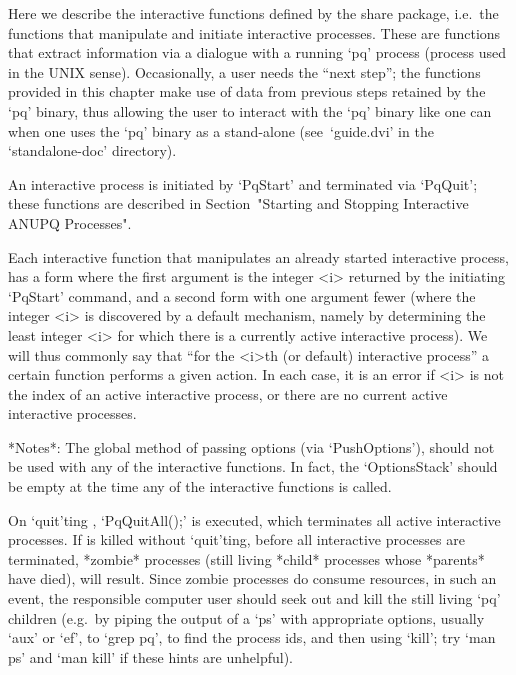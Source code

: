 

Here we describe the interactive functions defined by the {\ANUPQ}  share
package, i.e.~the functions  that  manipulate  and  initiate  interactive
{\ANUPQ} processes. These are functions that extract  information  via  a
dialogue with a running `pq' process (process used in  the  UNIX  sense).
Occasionally, a user needs the ``next step''; the functions  provided  in
this chapter make use of data from previous steps retained  by  the  `pq'
binary, thus allowing the user to interact with the `pq' binary like  one
can when one uses the `pq' binary as a  stand-alone  (see~`guide.dvi'  in
the `standalone-doc' directory).

An  interactive  {\ANUPQ}  process  is  initiated  by   `PqStart'   and
terminated  via  `PqQuit';   these   functions   are   described   in
Section~"Starting and Stopping Interactive ANUPQ Processes".

Each interactive {\ANUPQ} function that manipulates  an  already  started
interactive {\ANUPQ} process, has a form where the first argument is  the
integer <i> returned by the initiating `PqStart' command,  and  a  second
form with one argument fewer (where the integer <i> is  discovered  by  a
default mechanism, namely by determining the least integer <i> for  which
there is a currently active interactive {\ANUPQ} process). We  will  thus
commonly say that ``for  the  <i>th  (or  default)  interactive  {\ANUPQ}
process'' a certain function performs a given action. In each case, it is
an error if <i> is not the index of an  active  interactive  process,  or
there are no current active interactive processes.

*Notes*: 
The global method of passing options (via `PushOptions'), should  not  be
used with any of the interactive functions. In fact,  the  `OptionsStack'
should be empty at the time any of the interactive functions is called.

On `quit'ting {\GAP}, `PqQuitAll();' is executed,  which  terminates  all
active interactive  {\ANUPQ}  processes.  If  {\GAP}  is  killed  without
`quit'ting, before all interactive  {\ANUPQ}  processes  are  terminated,
*zombie* processes (still living *child* processes whose  *parents*  have
died), will result. Since zombie processes do consume resources, in  such
an event, the responsible computer user should  seek  out  and  kill  the
still living `pq' children (e.g.~by piping the  output  of  a  `ps'  with
appropriate options, usually `aux' or `ef', to `grep  pq',  to  find  the
process ids, and then using `kill'; try `man ps' and `man kill' if  these
hints are unhelpful).


